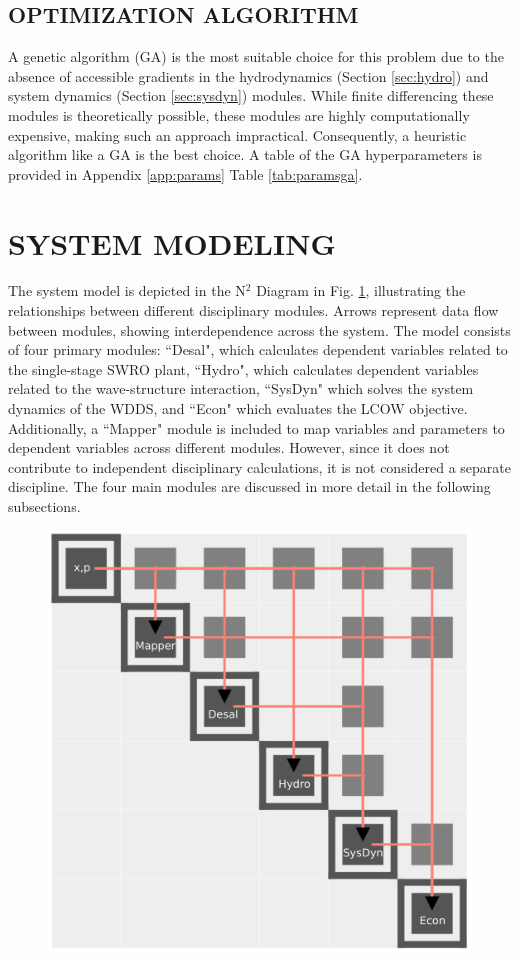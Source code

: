 \documentclass[twocolumn,10pt]{asme2e}
\begin{document}
\subsection{OPTIMIZATION ALGORITHM}
A genetic algorithm (GA) is the most suitable choice for this problem due to the absence of accessible gradients in the hydrodynamics (Section \ref{sec:hydro}) and system dynamics (Section \ref{sec:sysdyn}) modules. While finite differencing these modules is theoretically possible, these modules are highly computationally expensive, making such an approach impractical. Consequently, a heuristic algorithm like a GA is the best choice. A table of the GA hyperparameters is provided in Appendix \ref{app:params} Table \ref{tab:paramsga}.

\section{SYSTEM MODELING} \label{sec:sysmodel}
The system model is depicted in the N$^2$ Diagram in Fig. \ref{fig:n2}, illustrating the relationships between different disciplinary modules. Arrows represent data flow between modules, showing interdependence across the system. The model consists of four primary modules: ``Desal", which calculates dependent variables related to the single-stage SWRO plant, ``Hydro", which calculates dependent variables related to the wave-structure interaction, ``SysDyn" which solves the system dynamics of the WDDS, and ``Econ" which evaluates the LCOW objective. Additionally, a ``Mapper" module is included to map variables and parameters to dependent variables across different modules. However, since it does not contribute to independent disciplinary calculations, it is not considered a separate discipline. The four main modules are discussed in more detail in the following subsections. 

\begin{figure}
    \centering
    \includegraphics[width=0.7\linewidth]{../figs/n2.pdf}
    \label{fig:n2}
\end{figure} 
\end{document}
